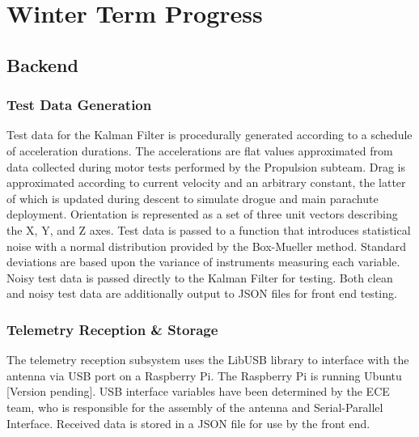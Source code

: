 \documentclass[journal,10pt,onecolumn,compsoc]{IEEEtran}
\begin{document}
\section{Winter Term Progress}

	\subsection{Backend}
		
		\subsubsection{Test Data Generation}
			Test data for the Kalman Filter is procedurally generated according to a schedule of acceleration durations.
			The accelerations are flat values approximated from data collected during motor tests performed by the Propulsion subteam.
			Drag is approximated according to current velocity and an arbitrary constant, the latter of which is updated during descent to simulate drogue and main parachute deployment.
			Orientation is represented as a set of three unit vectors describing the X, Y, and Z axes.
			Test data is passed to a function that introduces statistical noise with a normal distribution provided by the Box-Mueller method.
			Standard deviations are based upon the variance of instruments measuring each variable.
			Noisy test data is passed directly to the Kalman Filter for testing.
			Both clean and noisy test data are additionally output to JSON files for front end testing.
		
		\subsubsection{Telemetry Reception \& Storage}
			The telemetry reception subsystem uses the LibUSB library to interface with the antenna via USB port on a Raspberry Pi.
			The Raspberry Pi is running Ubuntu [Version pending].
			USB interface variables have been determined by the ECE team, who is responsible for the assembly of the antenna and Serial-Parallel Interface.
			Received data is stored in a JSON file for use by the front end.
			
\end{document}
